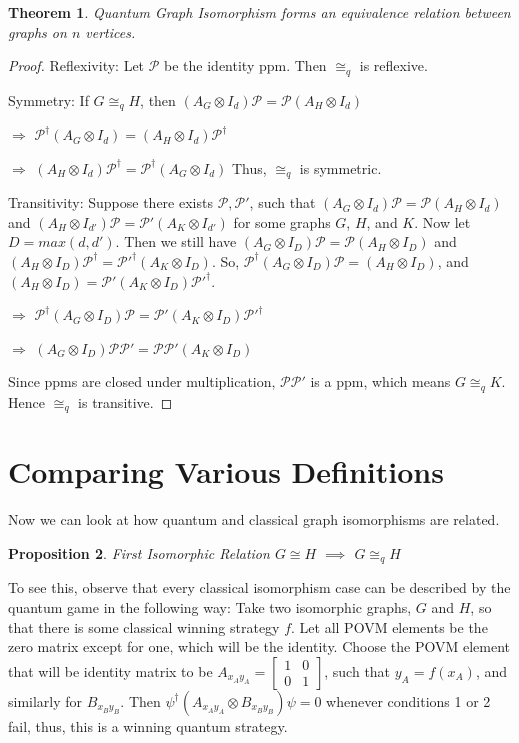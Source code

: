 \documentclass[12pt]{article}
\newtheorem{thm}{Theorem}[section]
\newtheorem{proposition}[thm]{Proposition}
\begin{document}
\begin{thm}
Quantum Graph Isomorphism forms an equivalence relation between graphs on $n$ vertices.
\end{thm}
\begin{proof}
Reflexivity: Let $\mathcal{P}$ be the identity ppm. Then $\cong_q$ is reflexive.

Symmetry: If $G \cong_q H$, then $(A_G \otimes I_d)\mathcal{P} = \mathcal{P} (A_H \otimes I_d)$

$\Rightarrow$ $\mathcal{P}^\dag (A_G \otimes I_d) = (A_H \otimes I_d) \mathcal{P}^\dag$

$\Rightarrow$ $(A_H \otimes I_d) \mathcal{P}^\dag = \mathcal{P}^\dag (A_G \otimes I_d)$
Thus, $\cong_q$ is symmetric.


Transitivity: Suppose there exists $\mathcal{P}, \mathcal{P}'$, such that $(A_G \otimes I_d)\mathcal{P} = \mathcal{P} (A_H \otimes I_d)$ and $(A_H \otimes I_{d'}) \mathcal{P} = \mathcal{P}' (A_K \otimes I_{d'})$ for some graphs $G$, $H$, and $K$. Now let $D = max(d, d')$. Then we still have $(A_G \otimes I_D)\mathcal{P} = \mathcal{P} (A_H \otimes I_D)$ and $(A_H \otimes I_{D}) \mathcal{P}^\dag = \mathcal{P}'^\dag (A_K \otimes I_{D})$. So, $\mathcal{P}^\dag (A_G \otimes I_D)\mathcal{P} = (A_H \otimes I_D)$, and $(A_H \otimes I_D) = \mathcal{P}' (A_K \otimes I_{D}) \mathcal{P}'^\dag$. 

$\Rightarrow$ $\mathcal{P}^\dag (A_G \otimes I_D)\mathcal{P} = \mathcal{P}' (A_K \otimes I_{D}) \mathcal{P}'^\dag$

$\Rightarrow$ $(A_G \otimes I_D)\mathcal{P} \mathcal{P}' = \mathcal{P} \mathcal{P}' (A_K \otimes I_{D})$

Since ppms are closed under multiplication, $\mathcal{P} \mathcal{P}'$ is a ppm, which means $G \cong_q K$. Hence $\cong_q$ is transitive.
\end{proof}


\section{Comparing Various Definitions}
Now we can look at how quantum and classical graph isomorphisms are related.

\begin{proposition}{First Isomorphic Relation}
\label{prop:isoimpliesqiso}
$G \cong H$ $\implies$ $G \cong_q H$
\end{proposition}
To see this, observe that every classical isomorphism case can be described by the quantum game in the following way: Take two isomorphic graphs, $G$ and $H$, so that there is some classical winning strategy $f$. Let all POVM elements be the zero matrix except for one, which will be the identity. Choose the POVM element that will be identity matrix to be $A_{x_Ay_A} = 
\begin{bmatrix}
1 & 0 \\
0 & 1
\end{bmatrix}$, such that $y_A = f(x_A)$, and similarly for $B_{x_By_B}$. Then $\psi^\dag(A_{x_Ay_A} \otimes B_{x_By_B})\psi = 0$ whenever conditions 1 or 2 fail, thus, this is a winning quantum strategy.
\end{document}
